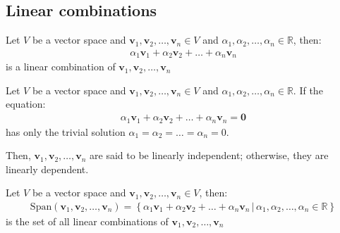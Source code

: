 \documentclass[11pt]{article}
\begin{document}
\subsection{Linear combinations}
\begin{definition}
    Let $V$ be a vector space and $\textbf{v}_1, \textbf{v}_2, \ldots, \textbf{v}_n \in V$ and $\alpha_1, \alpha_2, \ldots, \alpha_n \in \mathbb{R}$, then:
    \begin{align*}
        \alpha_1 \textbf{v}_1 + \alpha_2 \textbf{v}_2 + \ldots + \alpha_n \textbf{v}_n
    \end{align*}
    is a linear combination of $\textbf{v}_1, \textbf{v}_2, \ldots, \textbf{v}_n$
\end{definition}
\begin{definition}
    Let $V$ be a vector space and $\textbf{v}_1, \textbf{v}_2, \ldots, \textbf{v}_n \in V$ and $\alpha_1, \alpha_2, \ldots, \alpha_n \in \mathbb{R}$. If the equation:
    \begin{align*}
        \alpha_1 \textbf{v}_1 + \alpha_2 \textbf{v}_2 + \ldots + \alpha_n \textbf{v}_n = \textbf{0}
    \end{align*}
    has only the trivial solution $\alpha_1 = \alpha_2 = \ldots = \alpha_n = 0$.

    Then, $\textbf{v}_1, \textbf{v}_2, \ldots, \textbf{v}_n$ are said to be linearly independent; otherwise, they are linearly dependent.
\end{definition}
\begin{definition}[Span]
    Let $V$ be a vector space and $\textbf{v}_1, \textbf{v}_2, \ldots, \textbf{v}_n \in V$, then:
    \begin{align}
        \text{Span}(\textbf{v}_1, \textbf{v}_2, \ldots, \textbf{v}_n) = \left\{ \alpha_1 \textbf{v}_1 + \alpha_2 \textbf{v}_2 + \ldots + \alpha_n \textbf{v}_n \, | \, \alpha_1, \alpha_2, \ldots, \alpha_n \in \mathbb{R} \right\}
    \end{align}
    is the set of all linear combinations of $\textbf{v}_1, \textbf{v}_2, \ldots, \textbf{v}_n$
\end{definition}
\end{document}
